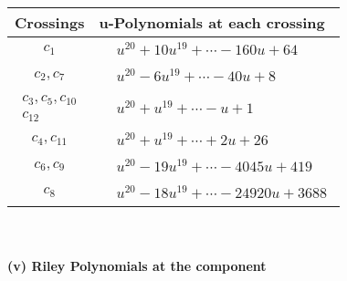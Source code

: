 \documentclass[1p]{elsarticle_modified}
\theoremstyle{definition}
\begin{document}
\begin{tabular}{m{50pt}|m{274pt}}
Crossings & \hspace{64pt}u-Polynomials at each crossing \\
\hline $$\begin{aligned}c_{1}\end{aligned}$$&$\begin{aligned}
&u^{20}+10 u^{19}+\cdots-160 u+64
\end{aligned}$\\
\hline $$\begin{aligned}c_{2},c_{7}\end{aligned}$$&$\begin{aligned}
&u^{20}-6 u^{19}+\cdots-40 u+8
\end{aligned}$\\
\hline $$\begin{aligned}c_{3},c_{5},c_{10}\\c_{12}\end{aligned}$$&$\begin{aligned}
&u^{20}+u^{19}+\cdots- u+1
\end{aligned}$\\
\hline $$\begin{aligned}c_{4},c_{11}\end{aligned}$$&$\begin{aligned}
&u^{20}+u^{19}+\cdots+2 u+26
\end{aligned}$\\
\hline $$\begin{aligned}c_{6},c_{9}\end{aligned}$$&$\begin{aligned}
&u^{20}-19 u^{19}+\cdots-4045 u+419
\end{aligned}$\\
\hline $$\begin{aligned}c_{8}\end{aligned}$$&$\begin{aligned}
&u^{20}-18 u^{19}+\cdots-24920 u+3688
\end{aligned}$\\
\hline
\end{tabular}\\~\\
\newpage\renewcommand{\arraystretch}{1}
\flushleft \textbf{(v) Riley Polynomials at the component}\newline \\
\end{document}
